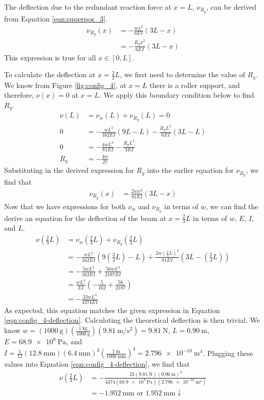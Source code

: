 \documentclass[12 pt]{article}
\begin{document}
The deflection due to the redundant reaction force at $x=L$, $\nu_{R_y}$, can be derived from Equation \ref{eqn:superpos_3}.
\begin{align*}
	\nu_{R_y}(x)&=-\frac{wx^2}{6EI}(3L-x)\\
	&=-\frac{R_yx^2}{6EI}(3L-x)
\end{align*}
This expression is true for all $x\in[0,L]$.

To calculate the deflection at $x=\frac{2}{3}L$, we first need to determine the value of $R_y$. We know from Figure \ref{fig:config_4}, at $x=L$ there is a roller support, and therefore, $\nu(x)=0$ at $x=L$. We apply this boundary condition below to find $R_y$.
\begin{align*}
	\nu(L)&=\nu_w(L)+\nu_{R_y}(L)=0\\
	0&=-\frac{wL^2}{162EI}(9L-L)-\frac{R_yL^2}{6EI}(3L-L)\\
	0&=-\frac{4wL^3}{81EI}-\frac{R_yL^3}{3EI}\\
	R_y&=-\frac{4w}{27}
\end{align*}
Substituting in the derived expression for $R_y$ into the earlier equation for $\nu_{R_y}$, we find that
\begin{align*}
	\nu_{R_y}(x)&=\frac{2wx^2}{81EI}(3L-x)
\end{align*}
Now that we have expressions for both $\nu_w$ and $\nu_{R_y}$ in terms of $w$, we can find the derive an equation for the deflection of the beam at $x=\frac{2}{3}L$ in terms of $w$, $E$, $I$, and $L$.
\begin{align*}
	\nu\left(\frac{2}{3}L\right)&=\nu_w\left(\frac{2}{3}L\right)+\nu_{R_y}\left(\frac{2}{3}L\right)\\
	&=-\frac{wL^2}{162EI}\left(9\left(\frac{2}{3}L\right)-L\right)+\frac{2w\left(\frac{2}{3}L\right)^2}{81EI}\left(3L-\left(\frac{2}{3}L\right)\right)\\
	&=-\frac{5wL^3}{162EI}+\frac{56wL^3}{2187EI}\\
	&=\frac{wL^3}{EI}\left(-\frac{5}{162}+\frac{56}{2187}\right)\\
	&=-\frac{23wL^3}{4374EI}
\end{align*}
As expected, this equation matches the given expression in Equation \ref{eqn:config_4-deflection}. Calculating the theoretical deflection is then trivial. We know $w=(\qty{1000}{\g})(\frac{\qty{1}{\kg}}{\qty{1000}{\g}})(\qty[per-mode=fraction]{9.81}{\m\per\s\squared})=\qty{9.81}{\N}$, $L=\qty{0.90}{\m}$, $E=\qty{68.9e9}{\Pa}$, and $I=\frac{1}{12}(\qty{12.8}{\mm})(\qty{6.4}{\mm})^3(\frac{\qty{1}{\m}}{\qty{1000}{\mm}})^4=\qty{2.796e-10}{\m^4}$. Plugging these values into Equation \ref{eqn:config_4-deflection}, we find that
\begin{align*}
	\nu\left(\frac{2}{3}L\right)&=-\frac{23(\qty{9.81}{\N})(\qty{0.90}{\m})^3}{4374(\qty{68.9e9}{\Pa})(\qty{2.796e-10}{\m^4})}\\
	&=\qty{-1.952}{\mm}\text{ or }\qty{1.952}{\mm}\downarrow
\end{align*}
\end{document}
